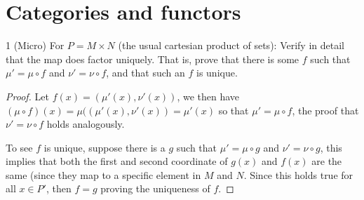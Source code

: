 \section{Categories and functors}


\begin{exercise}{1 (Micro)}
For $P = M \times N$ (the usual cartesian product of sets): 
Verify in detail that the map does factor uniquely. 
That is, prove that there is some $f$ such that $\mu' = \mu \circ f$ and $\nu' = \nu \circ f$, and that such an $f$ is unique.
\end{exercise}
\begin{proof}
Let $f(x) = (\mu'(x), \nu'(x))$, we then have $(\mu \circ f)(x) = \mu((\mu'(x), \nu'(x)) = \mu'(x)$ so that $\mu' = \mu \circ f$, the proof that $\nu' = \nu \circ f$ holds analogously.

To see $f$ is unique, suppose there is a $g$ such that $\mu' = \mu \circ g$ and $\nu' = \nu \circ g$, this implies that both the first and second coordinate of $g(x)$ and $f(x)$ are the same (since they map to a specific element in $M$ and $N$.
Since this holds true for all $x \in P'$, then $f = g$ proving the uniqueness of $f$.
\end{proof} 

